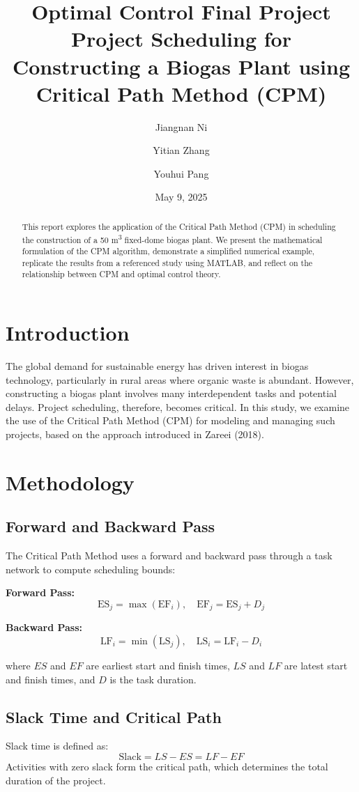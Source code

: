 \documentclass[12pt]{article}
\title{Optimal Control Final Project\\
\large Project Scheduling for Constructing a Biogas Plant using Critical Path Method (CPM)}
\author{Jiangnan Ni \and Yitian Zhang \and Youhui Pang}
\date{May 9, 2025}
\begin{document}
\maketitle

\begin{abstract}
This report explores the application of the Critical Path Method (CPM) in scheduling the construction of a 50 m\textsuperscript{3} fixed-dome biogas plant. We present the mathematical formulation of the CPM algorithm, demonstrate a simplified numerical example, replicate the results from a referenced study using MATLAB, and reflect on the relationship between CPM and optimal control theory.
\end{abstract}

\section{Introduction}
The global demand for sustainable energy has driven interest in biogas technology, particularly in rural areas where organic waste is abundant. However, constructing a biogas plant involves many interdependent tasks and potential delays. Project scheduling, therefore, becomes critical. In this study, we examine the use of the Critical Path Method (CPM) for modeling and managing such projects, based on the approach introduced in Zareei (2018).

\section{Methodology}

\subsection{Forward and Backward Pass}
The Critical Path Method uses a forward and backward pass through a task network to compute scheduling bounds:

\textbf{Forward Pass:}
\[
\text{ES}_j = \max(\text{EF}_i), \quad \text{EF}_j = \text{ES}_j + D_j
\]

\textbf{Backward Pass:}
\[
\text{LF}_i = \min(\text{LS}_j), \quad \text{LS}_i = \text{LF}_i - D_i
\]

where $ES$ and $EF$ are earliest start and finish times, $LS$ and $LF$ are latest start and finish times, and $D$ is the task duration.

\subsection{Slack Time and Critical Path}
Slack time is defined as:
\[
\text{Slack} = LS - ES = LF - EF
\]
Activities with zero slack form the critical path, which determines the total duration of the project.
\end{document}
